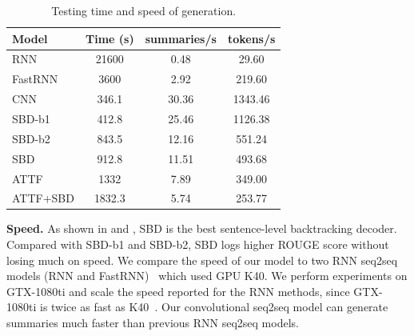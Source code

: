 \begin{table}[th]
\centering
\scriptsize
\begin{tabular}{|l|c|c|c|}
\hline
Model & Time (s) & summaries/s & tokens/s \\
\hline
RNN  &  21600 & 0.48 & 29.60 \\
FastRNN &  3600 & 2.92 & 219.60 \\
\hline
CNN &  346.1 & 30.36 & 1343.46 \\
SBD-b1 &  412.8 & 25.46 & 1126.38 \\
SBD-b2 &  843.5 & 12.16 & 551.24 \\
SBD &  912.8 & 11.51 & 493.68 \\
ATTF & 1332 & 7.89 &  349.00 \\
ATTF+SBD & 1832.3 & 5.74 &  253.77 \\
\hline
\end{tabular}
\caption{Testing time and speed of generation.}
\label{tab:eval_speed}
\end{table}


\textbf{Speed.} 
As shown in  and , 
SBD is the best sentence-level backtracking decoder.
Compared with SBD-b1 and SBD-b2,
SBD logs higher ROUGE score without losing much on speed. 
We compare the speed of our model to two RNN 
seq2seq models (RNN and FastRNN)~\cite{SeeLM17, P18-1063}
which used GPU K40. 
We perform experiments on GTX-1080ti and scale the speed 
reported for the RNN methods,
since GTX-1080ti is twice as fast as K40~\cite{gehring2017convs2s}.
Our convolutional seq2seq model can 
generate summaries much faster than previous RNN seq2seq models.

